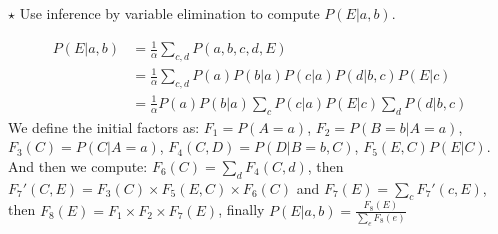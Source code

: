\documentclass[9pt,a4paper]{extarticle}
\newenvironment{solution}
    {%
    \color{red}
    }
    { 
    \color{black}
    }
\begin{document}
$\star$ Use inference by variable elimination to compute $P(E|a, b)$.
\begin{solution}
\begin{align}
    P(E|a, b) &= \frac{1}{\alpha} \sum_{c, d} P(a, b, c, d, E)\\
    &=\frac{1}{\alpha} \sum_{c, d} P(a)P(b|a)P(c|a)P(d|b, c)P(E|c)\\
    &=\frac{1}{\alpha} P(a)P(b|a) \sum_{c}P(c|a)P(E|c)\sum_d P(d|b,c)
\end{align}
We define the initial factors as:
$F_1 = P(A=a)$, $F_2 = P(B=b|A=a)$, $F_3(C) = P(C|A=a)$, $F_4(C, D) = P(D|B=b, C)$, $F_5(E, C)P(E|C)$.
And then we compute:
$F_6(C) = \sum_d F_4(C, d)$, then $F_7'(C, E) = F_3(C)\times F_5(E, C)\times F_6(C)$ and $F_7(E) = \sum_c F_7'(c, E)$, then $F_8(E) = F_1 \times F_2 \times F_7(E)$, finally $P(E|a, b) = \frac{F_8(E)}{\sum_e F_8(e)}$
\end{solution}
\end{document}
